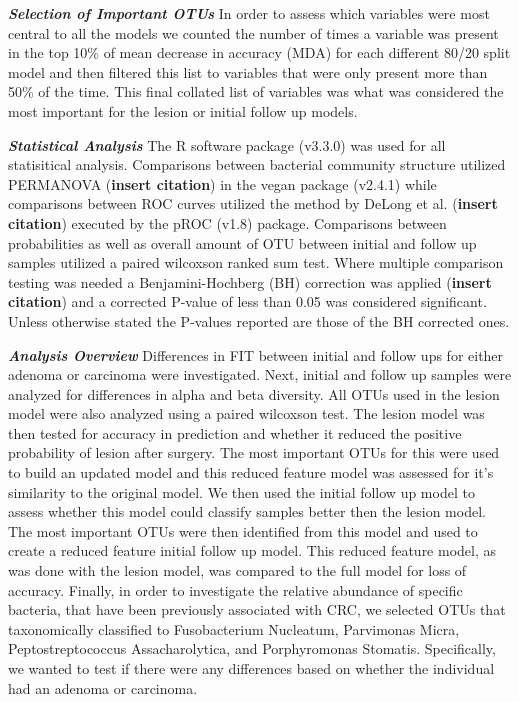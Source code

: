 \documentclass[12pt,]{article}
\begin{document}
\textbf{\emph{Selection of Important OTUs}} In order to assess which
variables were most central to all the models we counted the number of
times a variable was present in the top 10\% of mean decrease in
accuracy (MDA) for each different 80/20 split model and then filtered
this list to variables that were only present more than 50\% of the
time. This final collated list of variables was what was considered the
most important for the lesion or initial follow up models.

\textbf{\emph{Statistical Analysis}} The R software package (v3.3.0) was
used for all statisitical analysis. Comparisons between bacterial
community structure utilized PERMANOVA (\textbf{insert citation}) in the
vegan package (v2.4.1) while comparisons between ROC curves utilized the
method by DeLong et al. (\textbf{insert citation}) executed by the pROC
(v1.8) package. Comparisons between probabilities as well as overall
amount of OTU between initial and follow up samples utilized a paired
wilcoxson ranked sum test. Where multiple comparison testing was needed
a Benjamini-Hochberg (BH) correction was applied (\textbf{insert
citation}) and a corrected P-value of less than 0.05 was considered
significant. Unless otherwise stated the P-values reported are those of
the BH corrected ones.

\textbf{\emph{Analysis Overview}} Differences in FIT between initial and
follow ups for either adenoma or carcinoma were investigated. Next,
initial and follow up samples were analyzed for differences in alpha and
beta diversity. All OTUs used in the lesion model were also analyzed
using a paired wilcoxson test. The lesion model was then tested for
accuracy in prediction and whether it reduced the positive probability
of lesion after surgery. The most important OTUs for this were used to
build an updated model and this reduced feature model was assessed for
it's similarity to the original model. We then used the initial follow
up model to assess whether this model could classify samples better then
the lesion model. The most important OTUs were then identified from this
model and used to create a reduced feature initial follow up model. This
reduced feature model, as was done with the lesion model, was compared
to the full model for loss of accuracy. Finally, in order to investigate
the relative abundance of specific bacteria, that have been previously
associated with CRC, we selected OTUs that taxonomically classified to
Fusobacterium Nucleatum, Parvimonas Micra, Peptostreptococcus
Assacharolytica, and Porphyromonas Stomatis. Specifically, we wanted to
test if there were any differences based on whether the individual had
an adenoma or carcinoma.
\end{document}
